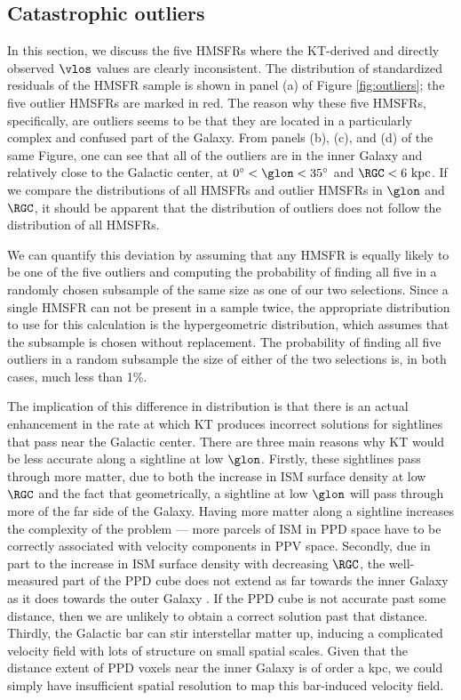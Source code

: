 \subsection{Catastrophic outliers}
\label{sec:discussion-catastrophic}
In this section, we discuss the five HMSFRs where the KT-derived and directly observed $\vlos$ values are clearly inconsistent.
The distribution of standardized residuals of the HMSFR sample is shown in panel (a) of Figure \ref{fig:outliers}; the five outlier HMSFRs are marked in red.
The reason why these five HMSFRs, specifically, are outliers seems to be that they are located in a particularly complex and confused part of the Galaxy.
From panels (b), (c), and (d) of the same Figure, one can see that all of the outliers are in the inner Galaxy and relatively close to the Galactic center, at $0^\circ < \glon < 35^\circ$ and $\RGC < 6\text{ kpc}$. 
If we compare the distributions of all HMSFRs and outlier HMSFRs in $\glon$ and $\RGC$, it should be apparent that the distribution of outliers does not follow the distribution of all HMSFRs.

We can quantify this deviation by assuming that any HMSFR is equally likely to be one of the five outliers and computing the probability of finding all five in a randomly chosen subsample of the same size as one of our two selections.
Since a single HMSFR can not be present in a sample twice, the appropriate distribution to use for this calculation is the hypergeometric distribution, which assumes that the subsample is chosen without replacement.
The probability of finding all five outliers in a random subsample the size of either of the two selections is, in both cases, much less than 1\%.

The implication of this difference in distribution is that there is an actual enhancement in the rate at which KT produces incorrect solutions for sightlines that pass near the Galactic center. 
There are three main reasons why KT would be less accurate along a sightline at low $\glon$.
Firstly, these sightlines pass through more matter, due to both the increase in ISM surface density at low $\RGC$ and the fact that geometrically, a sightline at low $\glon$ will pass through more of the far side of the Galaxy.
Having more matter along a sightline increases the complexity of the problem --- more parcels of ISM in PPD space have to be correctly associated with velocity components in PPV space.
Secondly, due in part to the increase in ISM surface density with decreasing $\RGC$, the well-measured part of the PPD cube does not extend as far towards the inner Galaxy as it does towards the outer Galaxy \citep{Green_2015}. 
If the PPD cube is not accurate past some distance, then we are unlikely to obtain a correct solution past that distance.
Thirdly, the Galactic bar can stir interstellar matter up, inducing a complicated velocity field with lots of structure on small spatial scales. 
Given that the distance extent of PPD voxels near the inner Galaxy is of order a kpc, we could simply have insufficient spatial resolution to map this bar-induced velocity field. 

